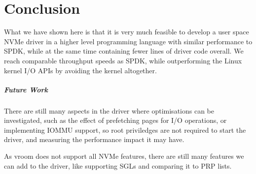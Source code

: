 \chapter{Conclusion}\label{c:c}
What we have shown here is that it is very much feasible to develop a user space NVMe driver in a higher level programming language with similar performance to SPDK, while at the same time containing fewer lines of driver code overall. We reach comparable throughput speeds as SPDK, while outperforming the Linux kernel I/O APIs by avoiding the kernel altogether.

\paragraph{Future Work}
There are still many aspects in the driver where optimisations can be investigated, such as the effect of prefetching pages for I/O operations, or implementing IOMMU support, so root priviledges are not required to start the driver, and measuring the performance impact it may have.

As vroom does not support all NVMe features, there are still many features we can add to the driver, like supporting SGLs and comparing it to PRP lists.
